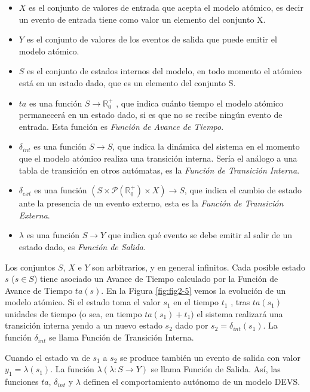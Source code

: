 	\begin{itemize}
	\item $X$ es el conjunto de valores de entrada que acepta el modelo atómico, es decir un evento de entrada tiene como valor un elemento del conjunto X.
	\item $Y$ es el conjunto de valores de los eventos de salida que puede emitir el modelo atómico.
	\item $S$ es el conjunto de estados internos del modelo, en todo momento el atómico está en un estado dado, que es un elemento del conjunto S.
	\item $ta$ es una función $S \to \mathbb{R}^{+}_{0}$ , que indica cuánto tiempo el modelo atómico permanecerá en un estado dado, si es que no se recibe ningún 
	evento de entrada. Esta función es \emph{Función de Avance de Tiempo}.
	\item $\delta_{int}$ es una función $S \to S$, que indica la dinámica del sistema en el momento que el modelo atómico realiza una transición interna. 
	Sería el análogo a una tabla de transición en otros autómatas, es la \emph{Función de Transición Interna}.
	\item $\delta_{ext}$ es una función $(S \times \mathcal{P}(\mathbb{R}^{+}_{0}) \times X) \to S$, que indica el cambio de estado ante la presencia de un evento 
	externo, esta es la \emph{Función de Transición Externa}.
	\item $\lambda$ es una función $S \to Y$ que indica qué evento se debe emitir al salir de un estado dado, es \emph{Función de Salida}.
	\end{itemize}

	Los conjuntos $S$, $X$ e $Y$ son arbitrarios, y en general infinitos. Cada posible estado $s$ ($s \in S$) tiene asociado un Avance de Tiempo calculado 
	por la Función de Avance de Tiempo $ta(s)$.
	En la Figura \ref{fig:fig2-5} vemos la evolución de un modelo atómico. Si el estado toma el valor $s_1$ en el tiempo $t_1$ , tras $ta(s_1)$ unidades de 
	tiempo (o sea, en tiempo $ta(s_1 ) + t_1 )$ el sistema realizará una transición interna yendo a un nuevo estado $s_2$ dado por $s_2 = \delta_{int} (s_1 )$. 
	La función $\delta_{int}$ se llama Función de Transición Interna.

	Cuando el estado va de $s_1$ a $s_2$ se produce también un evento de salida con valor $y_1 = \lambda(s_1)$. La función $\lambda (\lambda : S \to Y )$ se 
	llama Función de Salida. Así, las funciones $ta$, $\delta_{int}$ y $\lambda$ definen el comportamiento autónomo de un modelo DEVS.

